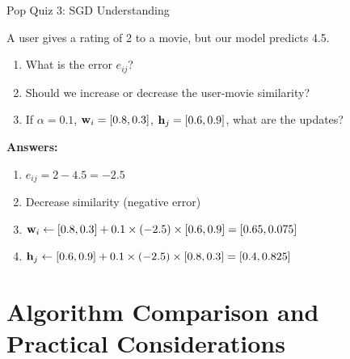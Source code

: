 \documentclass{beamer}
\begin{document}
\begin{frame}{Pop Quiz 3: SGD Understanding}
\begin{tcolorbox}[colback=orange!5!white,colframe=orange!75!black,title=Quick Check]
A user gives a rating of 2 to a movie, but our model predicts 4.5.

\pause
\begin{enumerate}[<+->]
    \item What is the error $e_{ij}$?
    \item Should we increase or decrease the user-movie similarity?
    \item If $\alpha = 0.1$, $\mathbf{w}_i = [0.8, 0.3]$, $\mathbf{h}_j = [0.6, 0.9]$, what are the updates?
\end{enumerate}

\pause
\textbf{Answers:}
\begin{enumerate}
    \item $e_{ij} = 2 - 4.5 = -2.5$
    \item Decrease similarity (negative error)
    \item $\mathbf{w}_i \leftarrow [0.8, 0.3] + 0.1 \times (-2.5) \times [0.6, 0.9] = [0.65, 0.075]$
    \item $\mathbf{h}_j \leftarrow [0.6, 0.9] + 0.1 \times (-2.5) \times [0.8, 0.3] = [0.4, 0.825]$
\end{enumerate}
\end{tcolorbox}
\end{frame}

\section{Algorithm Comparison and Practical Considerations}
\end{document}
